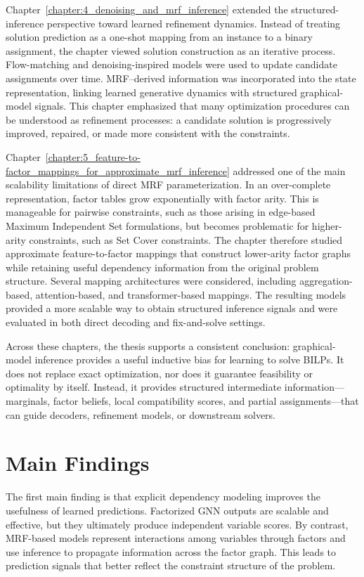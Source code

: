 Chapter~\ref{chapter:4_denoising_and_mrf_inference} extended the structured-inference perspective toward learned refinement dynamics. Instead of treating solution prediction as a one-shot mapping from an instance to a binary assignment, the chapter viewed solution construction as an iterative process. Flow-matching and denoising-inspired models were used to update candidate assignments over time. MRF--derived information was incorporated into the state representation, linking learned generative dynamics with structured graphical-model signals. This chapter emphasized that many optimization procedures can be understood as refinement processes: a candidate solution is progressively improved, repaired, or made more consistent with the constraints.

Chapter~\ref{chapter:5_feature-to-factor_mappings_for_approximate_mrf_inference} addressed one of the main scalability limitations of direct MRF parameterization. In an over-complete representation, factor tables grow exponentially with factor arity. This is manageable for pairwise constraints, such as those arising in edge-based Maximum Independent Set formulations, but becomes problematic for higher-arity constraints, such as Set Cover constraints. The chapter therefore studied approximate feature-to-factor mappings that construct lower-arity factor graphs while retaining useful dependency information from the original problem structure. Several mapping architectures were considered, including aggregation-based, attention-based, and transformer-based mappings. The resulting models provided a more scalable way to obtain structured inference signals and were evaluated in both direct decoding and fix-and-solve settings.

Across these chapters, the thesis supports a consistent conclusion: graphical-model inference provides a useful inductive bias for learning to solve BILPs. It does not replace exact optimization, nor does it guarantee feasibility or optimality by itself. Instead, it provides structured intermediate information—marginals, factor beliefs, local compatibility scores, and partial assignments—that can guide decoders, refinement models, or downstream solvers.

\section{Main Findings}

The first main finding is that explicit dependency modeling improves the usefulness of learned predictions. Factorized GNN outputs are scalable and effective, but they ultimately produce independent variable scores. By contrast, MRF-based models represent interactions among variables through factors and use inference to propagate information across the factor graph. This leads to prediction signals that better reflect the constraint structure of the problem.

